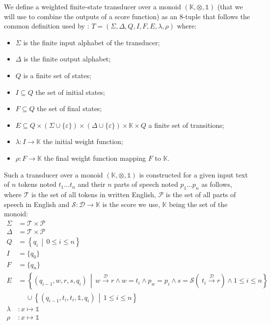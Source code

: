 \documentclass[a4paper, 11pt, onepage]{scrreprt}
\newcommand\maps[1]{\xrightarrow{\mathcal{#1}}}
\newcommand\suchthat{\, \middle| \,}
\begin{document}
We define a weighted finite-state transducer over a monoid
$(\mathbb{K}, \otimes, \mathbb{1})$ (that we will use to combine the
outputs of a score function) as an 8-tuple that follows the common
definition used by \cite{mohri2004weighted}: $T = (\Sigma, \Delta, Q,
I, F, E, \lambda, \rho)$ where:
\begin{itemize}
\item $\Sigma$ is the finite input alphabet of the transducer;
\item $\Delta$ is the finite output alphabet;
\item $Q$ is a finite set of states;
\item $I \subseteq Q$ the set of initial states;
\item $F \subseteq Q$ the set of final states;
\item $E \subseteq Q \times (\Sigma \cup \{\varepsilon\}) \times
  (\Delta \cup \{\varepsilon\}) \times \mathbb{K} \times Q$ a finite
  set of transitions;
\item $\lambda : I \rightarrow \mathbb{K}$ the initial weight function;
\item $\rho : F \rightarrow \mathbb{K}$ the final weight function mapping
  $F$ to $\mathbb{K}$.
\end{itemize}
Such a transducer over a monoid $(\mathbb{K}, \otimes, \mathbb{1})$ is
constructed for a given input text of $n$ tokens noted $t_1 \dots t_n$
and their $n$ parts of speech noted $p_1 \dots p_n$ as follows, where
$\mathcal{T}$ is the set of all tokens in written English,
$\mathcal{P}$ is the set of all parts of speech in English and
$\mathcal{S} : \mathcal{D} \rightarrow \mathbb{K}$ is the score we
use, $\mathbb{K}$ being the set of the monoid:
\begin{align*}
\Sigma & = \mathcal{T} \times \mathcal{P} \\
\Delta & = \mathcal{T} \times \mathcal{P} \\
Q & = \left\{ q_i \suchthat 0 \leq i \leq n \right\} \\
I & = \{ q_0 \} \\
F & = \{ q_n \} \\
E & = \left\{ (q_{i - 1}, w, r, s, q_i) \suchthat w \maps{D} r
    \land w = t_i \land p_w = p_i \land s = \mathcal{S}\left(\ t_i
      \maps{D} r \right) \land 1 \leq i \leq n \right\} \\
  & \quad \, \cup \left\{ (q_{i - 1}, t_i, t_i, \mathbb{1}, q_i)
    \suchthat 1 \leq i \leq n \right\} \\
\lambda & : x \mapsto \mathbb{1} \\
\rho & : x \mapsto \mathbb{1}
\end{align*}
\end{document}
